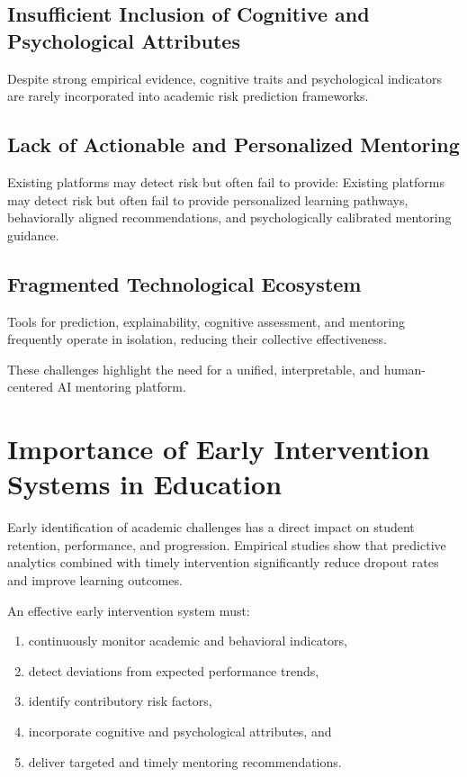 \documentclass[12pt,a4paper]{report}
\begin{document}
\subsection{Insufficient Inclusion of Cognitive and Psychological Attributes}
Despite strong empirical evidence, cognitive traits and psychological indicators are rarely incorporated into academic risk prediction frameworks.

\subsection{Lack of Actionable and Personalized Mentoring}
Existing platforms may detect risk but often fail to provide:
Existing platforms may detect risk but often fail to provide personalized learning pathways, behaviorally aligned recommendations, and psychologically calibrated mentoring guidance.

\subsection{Fragmented Technological Ecosystem}
Tools for prediction, explainability, cognitive assessment, and mentoring frequently operate in isolation, reducing their collective effectiveness.

These challenges highlight the need for a unified, interpretable, and human-centered AI mentoring platform.

\section{Importance of Early Intervention Systems in Education}

Early identification of academic challenges has a direct impact on student retention, performance, and progression. Empirical studies show that predictive analytics combined with timely intervention significantly reduce dropout rates and improve learning outcomes.

An effective early intervention system must:
\begin{enumerate}
    \item continuously monitor academic and behavioral indicators,
    \item detect deviations from expected performance trends,
    \item identify contributory risk factors,
    \item incorporate cognitive and psychological attributes, and
    \item deliver targeted and timely mentoring recommendations.
\end{enumerate}
\end{document}

